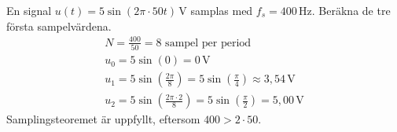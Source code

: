 \begin{exempel}[Sampelvärden]
En signal $u(t) = 5\sin(2\pi \cdot 50t)\,\text{V}$ samplas med $f_s = 400\,\text{Hz}$. Beräkna de
tre första sampelvärdena.
\begin{gather*}
  N = \frac{400}{50} = 8 \text{ sampel per period} \\
  u_0 = 5\sin(0) = 0\,\text{V} \\
  u_1 = 5\sin\left(\frac{2\pi}{8}\right) = 5\sin\left(\frac{\pi}{4}\right) \approx
  3{,}54\,\text{V} \\
  u_2 = 5\sin\left(\frac{2\pi \cdot 2}{8}\right) = 5\sin\left(\frac{\pi}{2}\right) =
  5{,}00\,\text{V}
\end{gather*}
Samplingsteoremet är uppfyllt, eftersom $400 > 2 \cdot 50$.
\end{exempel}
